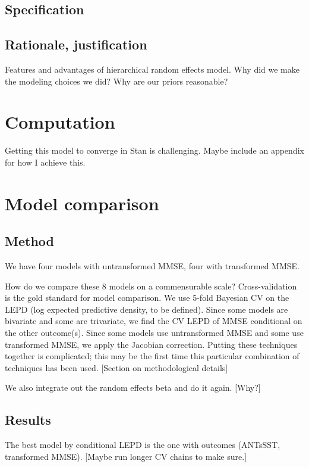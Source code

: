 \documentclass[12pt]{article}
\begin{document}
\subsection{Specification}

\subsection{Rationale, justification}

Features and advantages of hierarchical random effects model. Why did we make the modeling choices we did? Why are our priors reasonable?

\section{Computation}

Getting this model to converge in Stan is challenging. Maybe include an appendix for how I achieve this.

\section{Model comparison}

\subsection{Method}

We have four models with untransformed MMSE, four with transformed MMSE. 

How do we compare these 8 models on a commensurable scale? Cross-validation is the gold standard for model comparison. We use 5-fold Bayesian CV on the LEPD (log expected predictive density, to be defined). Since some models are bivariate and some are trivariate, we find the CV LEPD of MMSE conditional on the other outcome(s). Since some models use untransformed MMSE and some use transformed MMSE, we apply the Jacobian correction. Putting these techniques together is complicated; this may be the first time this particular combination of techniques has been used. 
[Section on methodological details]

We also integrate out the random effects beta and do it again. [Why?] 

\subsection{Results}

The best model by conditional LEPD is the one with outcomes (ANTsSST, transformed MMSE). [Maybe run longer CV chains to make sure.]
\end{document}
